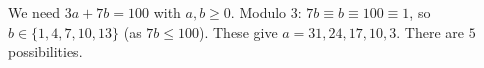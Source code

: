 We need $3a+7b=100$ with $a,b\ge0$. Modulo $3$: $7b\equiv b\equiv100\equiv1$, so $b\in\{1,4,7,10,13\}$ (as $7b\le100$). These give $a=31,24,17,10,3$. There are $\boxed{5}$ possibilities.
